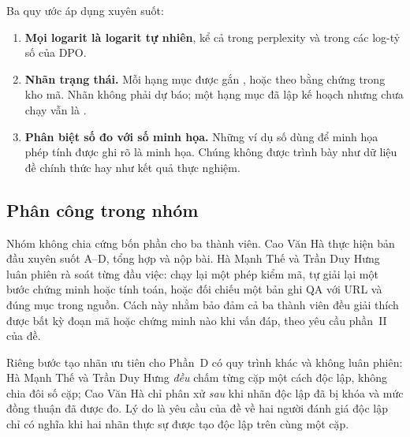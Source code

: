 Ba quy ước áp dụng xuyên suốt:

\begin{enumerate}[leftmargin=2em]
\item \textbf{Mọi logarit là logarit tự nhiên}, kể cả trong perplexity và trong
các log-tỷ số của DPO.
\item \textbf{Nhãn trạng thái.} Mỗi hạng mục được gắn \dalam, \motphan{} hoặc
\chualam{} theo bằng chứng trong kho mã. Nhãn không phải dự báo; một hạng mục đã
lập kế hoạch nhưng chưa chạy vẫn là \chualam.
\item \textbf{Phân biệt số đo với số minh họa.} Những ví dụ số dùng để minh họa
phép tính được ghi rõ là minh họa. Chúng không được trình bày như dữ liệu đề chính
thức hay như kết quả thực nghiệm.
\end{enumerate}

\subsection{Phân công trong nhóm}

Nhóm không chia cứng bốn phần cho ba thành viên. Cao Văn Hà thực hiện bản đầu
xuyên suốt A--D, tổng hợp và nộp bài. Hà Mạnh Thế và Trần Duy Hưng luân phiên rà
soát từng đầu việc: chạy lại một phép kiểm mã, tự giải lại một bước chứng minh
hoặc tính toán, hoặc đối chiếu một bản ghi QA với URL và đúng mục trong nguồn.
Cách này nhằm bảo đảm cả ba thành viên đều giải thích được bất kỳ đoạn mã hoặc
chứng minh nào khi vấn đáp, theo yêu cầu phần~II của đề.

Riêng bước tạo nhãn ưu tiên cho Phần~D có quy trình khác và không luân phiên: Hà
Mạnh Thế và Trần Duy Hưng \emph{đều} chấm từng cặp một cách độc lập, không chia
đôi số cặp; Cao Văn Hà chỉ phân xử \emph{sau} khi nhãn độc lập đã bị khóa và mức
đồng thuận đã được đo. Lý do là yêu cầu của đề về hai người đánh giá độc lập chỉ
có nghĩa khi hai nhãn thực sự được tạo độc lập trên cùng một cặp.
